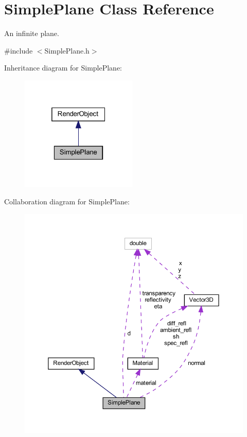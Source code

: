 \hypertarget{classSimplePlane}{}\section{Simple\+Plane Class Reference}
\label{classSimplePlane}


An infinite plane.  




{\ttfamily \#include $<$Simple\+Plane.\+h$>$}



Inheritance diagram for Simple\+Plane\+:
\nopagebreak
\begin{figure}[H]
\begin{center}
\leavevmode
\includegraphics[width=157pt]{classSimplePlane__inherit__graph}
\end{center}
\end{figure}


Collaboration diagram for Simple\+Plane\+:
\nopagebreak
\begin{figure}[H]
\begin{center}
\leavevmode
\includegraphics[width=350pt]{classSimplePlane__coll__graph}
\end{center}
\end{figure}
